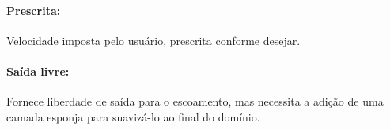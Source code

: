 \documentclass[12pt, a4paper]{article}
\newcommand{\SL}{{\bf SuLi}}
\begin{document}
\paragraph{Prescrita:} Velocidade imposta pelo usuário, prescrita conforme desejar.
\paragraph{Saída livre:} Fornece liberdade de saída para o escoamento, mas necessita a adição de uma camada esponja para suavizá-lo ao final do domínio.







\end{document}
